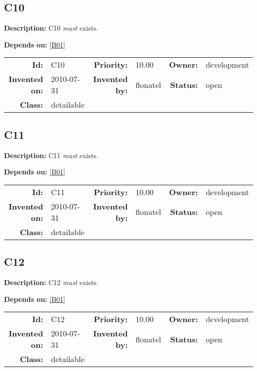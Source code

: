 \subsection{C10}\label{C10}
\textbf{Description:} C10 \textsl{must} exists.

\textbf{Depends on:} \ref{B01} 

\par
{\small \begin{center}\begin{tabular}{rlrlrl}
\textbf{Id:} & C10  & \textbf{Priority:} & 10.00  & \textbf{Owner:} & development\\ 
\textbf{Invented on:} & 2010-07-31  & \textbf{Invented by:} & flonatel  & \textbf{Status:} & open \\ 
\textbf{Class:} & detailable  & & & \end{tabular}\end{center} }
\subsection{C11}\label{C11}
\textbf{Description:} C11 \textsl{must} exists.

\textbf{Depends on:} \ref{B01} 

\par
{\small \begin{center}\begin{tabular}{rlrlrl}
\textbf{Id:} & C11  & \textbf{Priority:} & 10.00  & \textbf{Owner:} & development\\ 
\textbf{Invented on:} & 2010-07-31  & \textbf{Invented by:} & flonatel  & \textbf{Status:} & open \\ 
\textbf{Class:} & detailable  & & & \end{tabular}\end{center} }
\subsection{C12}\label{C12}
\textbf{Description:} C12 \textsl{must} exists.

\textbf{Depends on:} \ref{B01} 

\par
{\small \begin{center}\begin{tabular}{rlrlrl}
\textbf{Id:} & C12  & \textbf{Priority:} & 10.00  & \textbf{Owner:} & development\\ 
\textbf{Invented on:} & 2010-07-31  & \textbf{Invented by:} & flonatel  & \textbf{Status:} & open \\ 
\textbf{Class:} & detailable  & & & \end{tabular}\end{center} }

